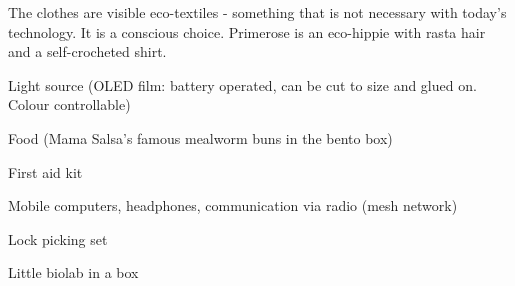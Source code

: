 \begin{npcBox}[title=Primrose]
    \begin{consequences}
    \item {}
    \item {}
    \item {}
    \end{consequences}

    \begin{npcDescription}
    The clothes are visible eco-textiles - something that is not necessary with today's technology. It is a conscious choice.
    Primerose is an eco-hippie with rasta hair and a self-crocheted shirt.
    \end{npcDescription}


    \begin{equipment}
    \item Light source (OLED film: battery operated, can be cut to size and glued on. Colour controllable)
    \item Food (Mama Salsa's famous mealworm buns in the bento box)
    \item First aid kit
    \item Mobile computers, headphones, communication via radio (mesh network)
    \item Lock picking set
    \item Little biolab in a box
    \end{equipment}
\end{npcBox}


